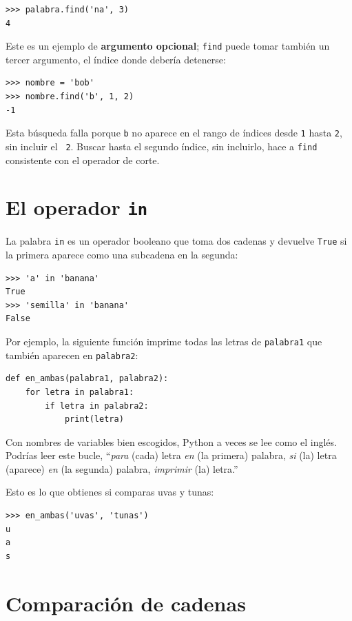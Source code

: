 \documentclass[10pt]{book}
\begin{document}
\begin{verbatim}
>>> palabra.find('na', 3)
4
\end{verbatim}
%
Este es un ejemplo de {\bf argumento opcional};
{\tt find} puede
tomar también un tercer argumento, el índice donde debería detenerse:

\begin{verbatim}
>>> nombre = 'bob'
>>> nombre.find('b', 1, 2)
-1
\end{verbatim}
%
Esta búsqueda falla porque {\tt b} no
aparece en el rango de índices desde {\tt 1} hasta {\tt 2}, sin incluir el {\tt
2}.  Buscar hasta el segundo índice, sin incluirlo, hace a
{\tt find} consistente con el operador de corte.



\section{El operador {\tt in}}
\label{inboth}

La palabra {\tt in} es un operador booleano que toma dos cadenas y
devuelve {\tt True} si la primera aparece como una subcadena en la segunda:

\begin{verbatim}
>>> 'a' in 'banana'
True
>>> 'semilla' in 'banana'
False
\end{verbatim}
%
Por ejemplo, la siguiente función imprime todas las
letras de {\tt palabra1} que también aparecen en {\tt palabra2}:

\begin{verbatim}
def en_ambas(palabra1, palabra2):
    for letra in palabra1:
        if letra in palabra2:
            print(letra)
\end{verbatim}
%
Con nombres de variables bien escogidos,
Python a veces se lee como el inglés.  Podrías leer
este bucle, ``{\em para} (cada) letra {\em en} (la primera) palabra, {\em si} (la) letra
(aparece) {\em en} (la segunda) palabra, {\em imprimir} (la) letra.''

Esto es lo que obtienes si comparas uvas y tunas:

\begin{verbatim}
>>> en_ambas('uvas', 'tunas')
u
a
s
\end{verbatim}
%

\section{Comparación de cadenas}
\end{document}
